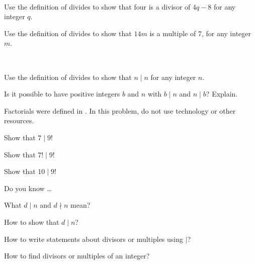 \begin{exer}[\exerU] %
\label{exer_prove_divides_general}  
~
    \begin{exerpart}
        \item Use the definition of divides to show that four is a divisor of $4q-8$ for any integer $q$. 
        \item Use the definition of divides to show that $14m$ is a multiple of 7, for any integer $m$.
    \end{exerpart}
\end{exer}

\begin{exer}[\exerU] %
\label{exer_dividesn}
~
    \begin{exerpart}
        \item Use the definition of divides to show that $n \mid n$ for any integer $n$.  
        \item Is it possible to have positive integers $b$ and $n$ with $b \mid n$ and $n \mid b$?  Explain.
    \end{exerpart}
\end{exer}

\begin{exer}[\exerU] %
\label{exer_divisors_of_factorials}
    Factorials were defined in .  In this problem, do not use technology or other resources.
        \begin{exerpart}
            \item Show that $7 \mid 9!$ 
            \item Show that $7! \mid 9!$
            \item Show that $10 \mid 9!$
        \end{exerpart}
\end{exer}

\begin{exer}[\exerR] %
\label{exer_dyk_divides}
    Do you know \ldots
        \begin{exerpart}
            \item What $d \mid n$ and $d \nmid n$ mean?
            \item How to show that $d \mid n$?
            \item How to write statements about divisors or multiples using $\mid$?
            \item How to find divisors or multiples of an integer? 
        \end{exerpart}
\end{exer}

